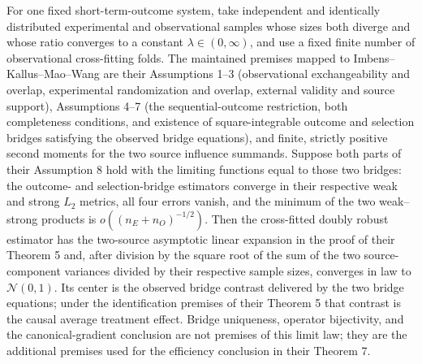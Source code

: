 For one fixed short-term-outcome system, take independent and identically distributed experimental and observational samples whose sizes both diverge and whose ratio converges to a constant \(\lambda\in(0,\infty)\), and use a fixed finite number of observational cross-fitting folds.  The maintained premises mapped to Imbens--Kallus--Mao--Wang are their Assumptions 1--3 (observational exchangeability and overlap, experimental randomization and overlap, external validity and source support), Assumptions 4--7 (the sequential-outcome restriction, both completeness conditions, and existence of square-integrable outcome and selection bridges satisfying the observed bridge equations), and finite, strictly positive second moments for the two source influence summands.  Suppose both parts of their Assumption 8 hold with the limiting functions equal to those two bridges: the outcome- and selection-bridge estimators converge in their respective weak and strong \(L_2\) metrics, all four errors vanish, and the minimum of the two weak--strong products is \(o((n_E+n_O)^{-1/2})\).  Then the cross-fitted doubly robust estimator has the two-source asymptotic linear expansion in the proof of their Theorem 5 and, after division by the square root of the sum of the two source-component variances divided by their respective sample sizes, converges in law to \(\mathcal N(0,1)\).  Its center is the observed bridge contrast delivered by the two bridge equations; under the identification premises of their Theorem 5 that contrast is the causal average treatment effect.  Bridge uniqueness, operator bijectivity, and the canonical-gradient conclusion are not premises of this limit law; they are the additional premises used for the efficiency conclusion in their Theorem 7.